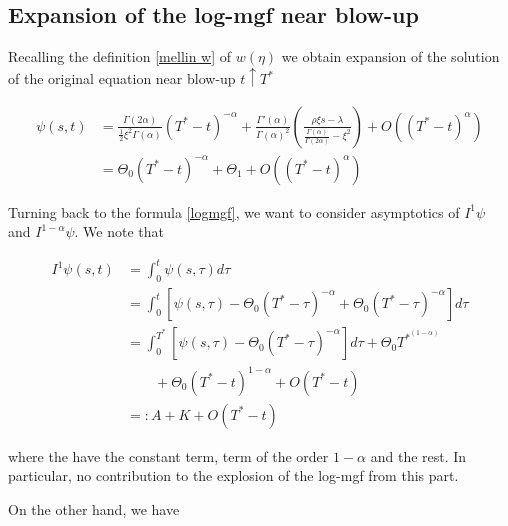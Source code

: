 \documentclass[12pt]{article}
\theoremstyle{plain}
\begin{document}
\subsection{Expansion of the log-mgf near blow-up}

Recalling the definition \eqref{mellin w} of $w(\eta)$ we obtain expansion of the solution of the original equation near blow-up $t \uparrow T^*$

\begin{equation}\label{psiexpansion}
\begin{aligned}
\psi(s, t) &= \frac{\Gamma(2\alpha)}{\frac 12 \xi^2 \Gamma(\alpha)} \left(T^*-t\right) ^{-\alpha} + \frac{\Gamma'(\alpha)}{\Gamma(\alpha)^2} \left(\frac{\rho\xi s - \lambda}{\frac{\Gamma(\alpha)}{\Gamma(2\alpha)} - \xi^2} \right) + O((T^* - t)^{\alpha})\\[10pt]
&= \Theta_0 (T^*-t)^{-\alpha} + \Theta_1 + O((T^*-t)^\alpha)
\end{aligned}
\end{equation}

Turning back to the formula \eqref{logmgf}, we want to consider asymptotics of $I^1\psi$ and $I^{1-\alpha}\psi$. We note that

\begin{equation}\label{i1expansion}
\begin{aligned}
I^1\psi(s,t) &= \int _0 ^t \psi(s, \tau) d\tau\\[10pt]
&= \int _0^t\left[\psi(s,\tau) - \Theta_0 (T^*-\tau)^{-\alpha} + \Theta_0(T^*-\tau)^{-\alpha}\right] d\tau\\[10pt]
&= \int _0^{T^*} \left[\psi(s,\tau)  - \Theta_0(T^*-\tau)^{-\alpha}\right] d\tau + \Theta_0 T^{*}^{(1-\alpha)} \\
&\qquad + \Theta_0 (T^*-t)^{1-\alpha} + O(T^*-t)\\[10pt]
&=: A+K +O(T^*-t)
\end{aligned}
\end{equation}

where the have the constant term, term of the order $1-\alpha$ and the rest. In particular, no contribution to the explosion of the log-mgf from this part.

On the other hand, we have
\end{document}
